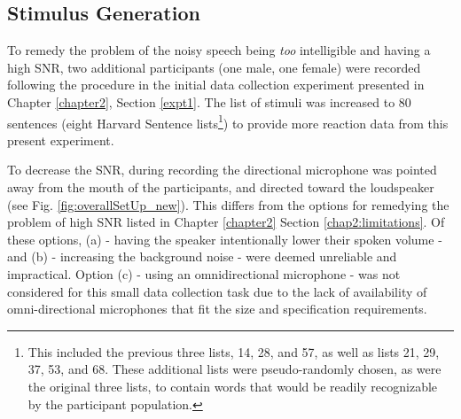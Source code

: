 \subsection{Stimulus Generation}
\label{chap3:methods:stimuli}

To remedy the problem of the noisy speech being \textit{too} intelligible and having a high SNR, 
two additional participants (one male, one female) were recorded following the procedure in the initial data collection experiment presented in Chapter \ref{chapter2}, Section \ref{expt1}.  The list of stimuli was increased to 80 sentences (eight Harvard Sentence lists\footnote{This included the previous three lists, 14, 28, and 57, as well as lists 21, 29, 37, 53, and 68. These additional lists were pseudo-randomly chosen, as were the original three lists, to contain words that would be readily recognizable by the participant population.}) to provide more reaction data from this present experiment.  

To decrease the SNR, during recording the directional microphone was pointed away from the mouth of the participants, and directed toward the loudspeaker (see Fig. \ref{fig:overallSetUp_new}).  This differs from the options for remedying the problem of high SNR listed in Chapter \ref{chapter2} Section \ref{chap2:limitations}.  Of these options, (a) - having the speaker intentionally lower their spoken volume - and (b) - increasing the background noise - were deemed unreliable and impractical.  Option (c) - using an omnidirectional microphone - was not considered for this small data collection task due to the lack of availability of omni-directional microphones that fit the size and specification requirements.

